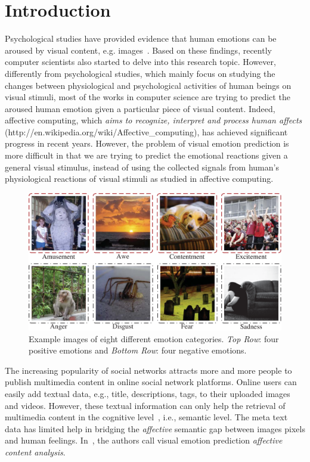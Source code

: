 \documentclass[letterpaper]{article}
\begin{document}
\section{Introduction}
Psychological studies have provided evidence that human emotions can be aroused by visual content, e.g. images~\cite{lang1979bio,lang1998emotion,joshi2011aesthetics}. Based on these findings, recently computer scientists also started to delve into this research topic. However, differently from psychological studies, which mainly focus on studying the changes between physiological and psychological activities of human beings on visual stimuli, most of the works in computer science are trying to predict the aroused human emotion given a particular piece of visual content. Indeed, affective computing, which \textit{aims to recognize, interpret and process human affects} (http://en.wikipedia.org/wiki/Affective\_computing), has achieved significant progress in recent years. However, the problem of visual emotion prediction is more difficult in that we are trying to predict the emotional reactions given a general visual stimulus, instead of using the collected signals from human's physiological reactions of visual stimuli as studied in affective computing.
\begin{figure}
\begin{center}
\includegraphics[width=.45\textwidth]{./Visio-example_imgs-crop}
\end{center}
\caption{Example images of eight different emotion categories. \textit{Top Row}: four positive emotions and \textit{Bottom Row}: four negative emotions.}
\label{fig:example:imgs}
\end{figure}

The increasing popularity of social networks attracts more and more people to publish multimedia content in online social network platforms.
Online users can easily add textual data, e.g., title, descriptions, tags, to their uploaded images and videos. However, these textual information can only help the retrieval of multimedia content in the cognitive level~\cite{machajdik2010affective}, i.e., semantic level. The meta text data has limited help in bridging the \textit{affective} semantic gap between images pixels and human feelings. In~\cite{hanjalic2006extracting}, the authors call visual emotion prediction \textit{affective content analysis}.
\end{document}
